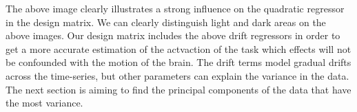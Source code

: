 The above image clearly illustrates a strong influence on the quadratic regressor in
the design matrix. We can clearly distinguish light and dark areas on the above images.
Our design matrix includes the above drift regressors in order to get a more accurate
estimation of the actvaction of the task which effects will not be confounded with the 
motion of the brain.
The drift terms model gradual drifts across the time-series, but other parameters can
explain the variance in the data. The next section is aiming to find the principal 
components of the data that have the most variance.
